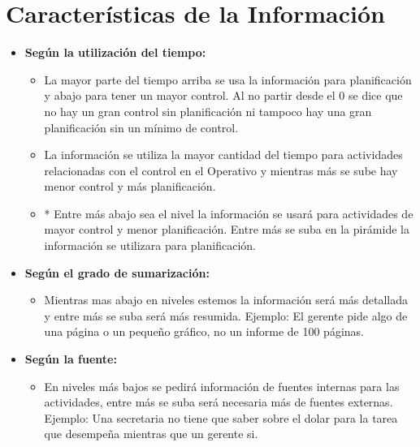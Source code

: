 \documentclass{templateNote}
\begin{document}
\section{Características de la Información}
\begin{figure}[H]
    \begin{center}
        \noindent{}
    \end{center}
\end{figure}
\begin{itemize}
    \item \textbf{Según la utilización del tiempo:}
    \begin{itemize}
        \item La mayor parte del tiempo arriba se usa la información para planificación y abajo para tener un mayor control. Al no partir desde el 0 se dice que no hay un gran control sin planificación ni tampoco hay una gran planificación sin un mínimo de control.
        \item La información se utiliza la mayor cantidad del tiempo para actividades relacionadas con el control en el Operativo y mientras más se sube hay menor control y más planificación.
        \item * Entre más abajo sea el nivel la información se usará para actividades de mayor control y menor planificación. Entre más se suba en la pirámide la información se utilizara para planificación.
    \end{itemize}

    \item \textbf{Según el grado de sumarización:}
    \begin{itemize}
        \item Mientras mas abajo en niveles estemos la información será más detallada y entre más se suba será más resumida. Ejemplo: El gerente pide algo de una página o un pequeño gráfico, no un informe de 100 páginas.
    \end{itemize}

    \item \textbf{Según la fuente:}
    \begin{itemize}
        \item En niveles más bajos se pedirá información de fuentes internas para las actividades, entre más se suba será necesaria más de fuentes externas. Ejemplo: Una secretaria no tiene que saber sobre el dolar para la tarea que desempeña mientras que un gerente si.
    \end{itemize}
\end{itemize}
\end{document}
